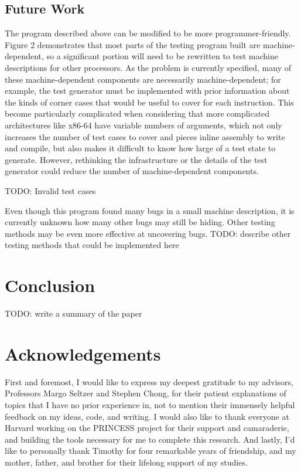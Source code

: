 \documentclass[letterpaper,12pt]{article}
\begin{document}
\subsection{Future Work}

The program described above can be modified to be more programmer-friendly. Figure 2 demonstrates that most parts of the testing program built are machine-dependent, so a significant portion will need to be rewritten to test machine descriptions for other processors. As the problem is currently specified, many of these machine-dependent components are necessarily machine-dependent; for example, the test generator must be implemented with prior information about the kinds of corner cases that would be useful to cover for each instruction. This become particularly complicated when considering that more complicated architectures like x86-64 have variable numbers of arguments, which not only increases the number of test cases to cover and pieces inline assembly to write and compile, but also makes it difficult to know how large of a test state to generate. However, rethinking the infrastructure or the details of the test generator could reduce the number of machine-dependent components.

TODO: Invalid test cases

Even though this program found many bugs in a small machine description, it is currently unknown how many other bugs may still be hiding. Other testing methods may be even more effective at uncovering bugs. TODO: describe other testing methods that could be implemented here

\section{Conclusion}

TODO: write a summary of the paper

\section{Acknowledgements}
First and foremost, I would like to express my deepest gratitude to my advisors, Professors Margo Seltzer and Stephen Chong, for their patient explanations of topics that I have no prior experience in, not to mention their immensely helpful feedback on my ideas, code, and writing. I would also like to thank everyone at Harvard working on the PRINCESS project for their support and camaraderie, and building the tools necessary for me to complete this research. And lastly, I'd like to personally thank Timothy for four remarkable years of friendship, and my mother, father, and brother for their lifelong support of my studies.

{\footnotesize 
}


\end{document}
